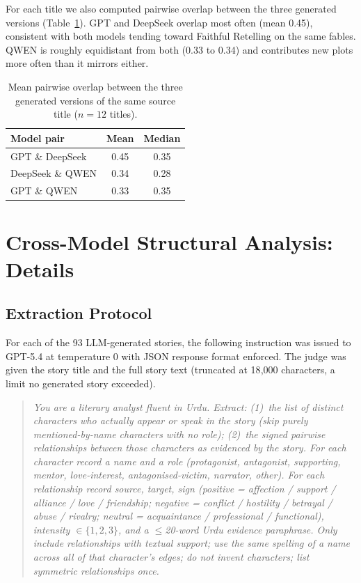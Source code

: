 \documentclass[11pt]{article}
\begin{document}
For each title we also computed pairwise overlap between
the three generated versions
(Table~\ref{tab:mem_cross_model}). GPT and DeepSeek
overlap most often (mean 0.45), consistent with both
models tending toward Faithful Retelling on the same
fables. QWEN is roughly equidistant from both (0.33 to
0.34) and contributes new plots more often than it
mirrors either.

\begin{table}[h]
\centering\small
\caption{Mean pairwise overlap between the three generated
versions of the same source title ($n=12$ titles).}
\label{tab:mem_cross_model}
\begin{tabular}{lcc}
\hline
\textbf{Model pair}  & \textbf{Mean} & \textbf{Median} \\
\hline
GPT \& DeepSeek       & 0.45 & 0.35 \\
DeepSeek \& QWEN      & 0.34 & 0.28 \\
GPT \& QWEN           & 0.33 & 0.35 \\
\hline
\end{tabular}
\end{table}



\section{Cross-Model Structural Analysis: Details}
\label{app:network_details}

\subsection{Extraction Protocol}
\label{app:network_extraction}

For each of the 93 LLM-generated stories, the following
instruction was issued to GPT-5.4 at temperature 0 with
JSON response format enforced. The judge was given the
story title and the full story text (truncated at
18{,}000 characters, a limit no generated story
exceeded).

\begin{quote}\small\itshape
You are a literary analyst fluent in Urdu. Extract:
(1)~the list of distinct characters who actually appear
or speak in the story (skip purely mentioned-by-name
characters with no role); (2)~the signed pairwise
relationships between those characters as evidenced by
the story. For each character record a name and a role
(protagonist, antagonist, supporting, mentor,
love-interest, antagonised-victim, narrator, other).
For each relationship record source, target, sign
(\textit{positive} = affection / support / alliance /
love / friendship; \textit{negative} = conflict /
hostility / betrayal / abuse / rivalry;
\textit{neutral} = acquaintance / professional /
functional), intensity $\in \{1,2,3\}$, and a
$\leq$20-word Urdu evidence paraphrase. Only include
relationships with textual support; use the same
spelling of a name across all of that character's
edges; do not invent characters; list symmetric
relationships once.
\end{quote}
\end{document}
